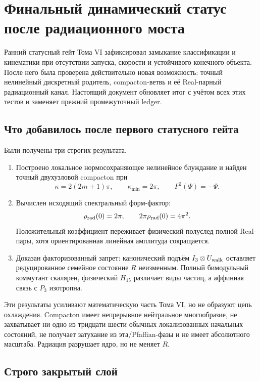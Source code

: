 \chapter{Финальный динамический статус после радиационного моста}

Ранний статусный гейт Тома VI зафиксировал замыкание классификации и
кинематики при отсутствии запуска, скорости и устойчивого конечного
объекта. После него была проверена действительно новая возможность:
точный нелинейный дискретный родитель, compacton-ветвь и её Real-парный
радиационный канал. Настоящий документ обновляет итог с учётом всех этих
тестов и заменяет прежний промежуточный ledger.

\section{Что добавилось после первого статусного гейта}

Были получены три строгих результата.
\begin{enumerate}
 \item Построено локальное нормосохраняющее нелинейное блуждание и найден
 точный двухузловой compacton при
 \begin{equation}
  \kappa=2(2m+1)\pi,
  \qquad \kappa_{\min}=2\pi,
  \qquad F^2(\Psi)=-\Psi.
 \end{equation}
 \item Вычислен исходящий спектральный форм-фактор:
 \begin{equation}
  \rho_{\rm rad}(0)=2\pi,
  \qquad 2\pi\rho_{\rm rad}(0)=4\pi^2.
 \end{equation}
 Положительный коэффициент переживает физический полуслед полной
 Real-пары, хотя ориентированная линейная амплитуда сокращается.
 \item Доказан факторизованный запрет: канонический подъём
 $I_3\otimes U_{\rm walk}$ оставляет редуцированное семейное состояние
 $R$ неизменным. Полный бимодульный коммутант скалярен, физический
 $H_{15}$ различает виды частиц, а аффинная связь с $P_3$ изотропна.
\end{enumerate}

Эти результаты усиливают математическую часть Тома VI, но не образуют
цепь охлаждения. Compacton имеет непрерывное нейтральное многообразие,
не захватывает ни одно из тридцати шести обычных локализованных начальных
состояний, не получает затухание из эта/Pfaffian-фазы и не имеет
абсолютного масштаба. Радиация разрушает ядро, но не меняет $R$.

\section{Строго закрытый слой}

